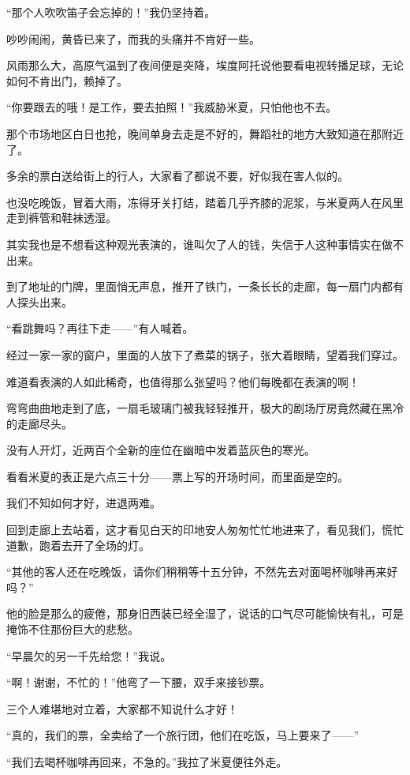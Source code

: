 \par “那个人吹吹笛子会忘掉的！”我仍坚持着。
\par 吵吵闹闹，黄昏已来了，而我的头痛并不肯好一些。
\par 风雨那么大，高原气温到了夜间便是突降，埃度阿托说他要看电视转播足球，无论如何不肯出门，赖掉了。
\par “你要跟去的哦！是工作，要去拍照！”我威胁米夏，只怕他也不去。
\par 那个市场地区白日也抢，晚间单身去走是不好的，舞蹈社的地方大致知道在那附近了。
\par 多余的票白送给街上的行人，大家看了都说不要，好似我在害人似的。
\par 也没吃晚饭，冒着大雨，冻得牙关打结，踏着几乎齐膝的泥浆，与米夏两人在风里走到裤管和鞋袜透湿。
\par 其实我也是不想看这种观光表演的，谁叫欠了人的钱，失信于人这种事情实在做不出来。
\par 到了地址的门牌，里面悄无声息，推开了铁门，一条长长的走廊，每一扇门内都有人探头出来。
\par “看跳舞吗？再往下走——”有人喊着。
\par 经过一家一家的窗户，里面的人放下了煮菜的锅子，张大着眼睛，望着我们穿过。
\par 难道看表演的人如此稀奇，也值得那么张望吗？他们每晚都在表演的啊！
\par 弯弯曲曲地走到了底，一扇毛玻璃门被我轻轻推开，极大的剧场厅房竟然藏在黑冷的走廊尽头。
\par 没有人开灯，近两百个全新的座位在幽暗中发着蓝灰色的寒光。
\par 看看米夏的表正是六点三十分——票上写的开场时间，而里面是空的。
\par 我们不知如何才好，进退两难。
\par 回到走廊上去站着，这才看见白天的印地安人匆匆忙忙地进来了，看见我们，慌忙道歉，跑着去开了全场的灯。
\par “其他的客人还在吃晚饭，请你们稍稍等十五分钟，不然先去对面喝杯咖啡再来好吗？”
\par 他的脸是那么的疲倦，那身旧西装已经全湿了，说话的口气尽可能愉快有礼，可是掩饰不住那份巨大的悲愁。
\par “早晨欠的另一千先给您！”我说。
\par “啊！谢谢，不忙的！”他弯了一下腰，双手来接钞票。
\par 三个人难堪地对立着，大家都不知说什么才好！
\par “真的，我们的票，全卖给了一个旅行团，他们在吃饭，马上要来了——”
\par “我们去喝杯咖啡再回来，不急的。”我拉了米夏便往外走。
